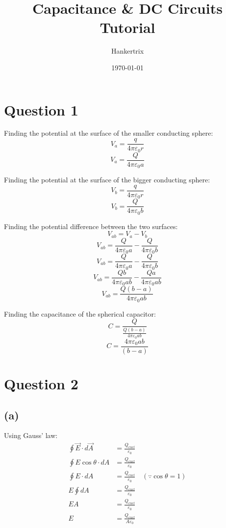 \documentclass[11pt]{article}
\author{Hankertrix}
\date{\today}
\title{Capacitance \& DC Circuits Tutorial}
\begin{document}
\maketitle
\setcounter{tocdepth}{2}
\tableofcontents \clearpage\section{Question 1}
\label{sec:orgd346228}
Finding the potential at the surface of the smaller conducting sphere:
\[V_a = \frac{q}{4 \pi \varepsilon_0 r}\]
\[V_a = \frac{Q}{4 \pi \varepsilon_0 a}\]

Finding the potential at the surface of the bigger conducting sphere:
\[V_b = \frac{q}{4 \pi \varepsilon_0 r}\]
\[V_b = \frac{Q}{4 \pi \varepsilon_0 b}\]

Finding the potential difference between the two surfaces:
\[V_{ab} = V_a - V_b\]
\[V_{ab} = \frac{Q}{4 \pi \varepsilon_0 a} - \frac{Q}{4 \pi \varepsilon_0 b}\]
\[V_{ab} = \frac{Q}{4 \pi \varepsilon_0 a} - \frac{Q}{4 \pi \varepsilon_0 b}\]
\[V_{ab} = \frac{Qb}{4 \pi \varepsilon_0 ab} - \frac{Qa}{4 \pi \varepsilon_0 ab}\]
\[V_{ab} = \frac{Q(b - a)}{4 \pi \varepsilon_0 ab}\]

Finding the capacitance of the spherical capacitor:
\[C = \frac{Q}{\frac{Q(b - a)}{4 \pi \varepsilon_0 ab}}\]
\[C = \frac{4 \pi \varepsilon_0 ab}{(b - a)}\]
\section{Question 2}
\label{sec:org90db684}

\subsection{(a)}
\label{sec:orgde4c480}
Using Gauss' law:
\begin{align*}
\oint \vec{E} \cdot d \vec{A} &= \frac{Q_{encl}}{\varepsilon_0} \\
\oint E \cos \theta \cdot dA &= \frac {Q_{encl}}{\varepsilon_0} \\
\oint E \cdot dA &= \frac {Q_{encl}}{\varepsilon_0} \quad (\because \cos \theta = 1) \\
E \oint dA &= \frac {Q_{encl}}{\varepsilon_0} \\
E A &= \frac {Q_{encl}}{\varepsilon_0} \\
E &= \frac {Q_{encl}}{A \varepsilon_0} \\
\end{align*}

\newpage
\end{document}
